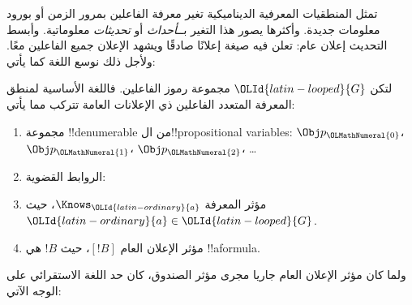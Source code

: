 \documentclass[../../../include/open-logic-section]{subfiles}
\begin{document}


تمثل المنطقيات المعرفية الديناميكية تغير معرفة الفاعلين بمرور الزمن أو
بورود معلومات جديدة. وأكثرها يصور هذا التغير بــ\emph{أحداث} أو
\emph{تحديثات} معلوماتية. وأبسط التحديث إعلان عام: تعلن فيه صيغة إعلانًا
صادقًا ويشهد الإعلان جميع الفاعلين معًا. ولأجل ذلك نوسع اللغة كما يأتي:

\begin{defn}
لتكن $\OLId{latin-looped}{G}$ مجموعة رموز الفاعلين. فاللغة الأساسية لمنطق المعرفة المتعدد
الفاعلين ذي الإعلانات العامة تتركب مما يأتي:
\begin{enumerate}
  \item مجموعة !!{denumerable} من ال!!{propositional variable}s:
    $\Obj p_\OLMathNumeral{0}$، $\Obj p_\OLMathNumeral{1}$، $\Obj p_\OLMathNumeral{2}$، \dots
  \item الروابط القضوية: \startycommalist
  \item مؤثر المعرفة $\Knows_\OLId{latin-ordinary}{a}$، حيث $\OLId{latin-ordinary}{a} \in \OLId{latin-looped}{G}$.
  \item مؤثر الإعلان العام $[!B]$، حيث $!B$ هي !!a{formula}.
\end{enumerate}
\end{defn}

ولما كان مؤثر الإعلان العام جاريا مجرى مؤثر الصندوق، كان حد اللغة
الاستقرائي على الوجه الآتي:
\end{document}

